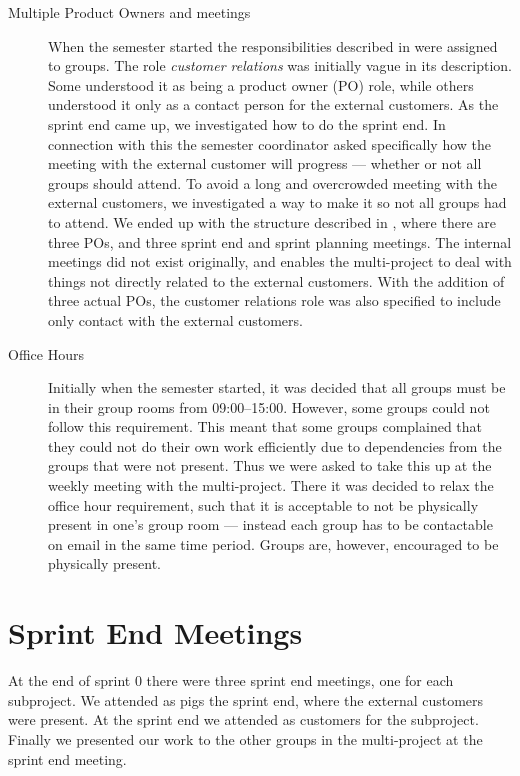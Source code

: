 \begin{description}
  \item[Multiple Product Owners and meetings] When the semester started the responsibilities described in  were assigned to groups. The role \emph{customer relations} was initially vague in its description. Some understood it as being a product owner (PO) role, while others understood it only as a contact person for the external customers. As the sprint end came up, we investigated how to do the sprint end. In connection with this the semester coordinator asked specifically how the meeting with the external customer will progress --- whether or not all groups should attend. To avoid a long and overcrowded meeting with the external customers, we investigated a way to make it so not all groups had to attend. We ended up with the structure described in , where there are three POs, and three sprint end and sprint planning meetings. The internal meetings did not exist originally, and enables the multi-project to deal with things not directly related to the external customers. With the addition of three actual POs, the customer relations role was also specified to include only contact with the external customers.
  \item[Office Hours] Initially when the semester started, it was decided that all groups must be in their group rooms from 09:00--15:00. However, some groups could not follow this requirement. This meant that some groups complained that they could not do their own work efficiently due to dependencies from the groups that were not present. Thus we were asked to take this up at the weekly meeting with the multi-project. There it was decided to relax the office hour requirement, such that it is acceptable to not be physically present in one's group room --- instead each group has to be contactable on email in the same time period. Groups are, however, encouraged to be physically present.
\end{description}

\section{Sprint End Meetings}
At the end of sprint 0 there were three sprint end meetings, one for each subproject. We attended as pigs the \gui sprint end, where the external customers were present. At the \db sprint end we attended as customers for the \db subproject. Finally we presented our work to the other groups in the multi-project at the \bd sprint end meeting.

